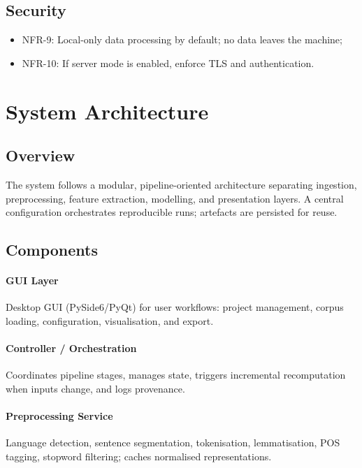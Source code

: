 \subsection{Security}
\begin{itemize}
    \item NFR-9: Local-only data processing by default; no data leaves the machine;
    \item NFR-10: If server mode is enabled, enforce TLS and authentication.
\end{itemize}

\section{System Architecture}
\subsection{Overview}
The system follows a modular, pipeline-oriented architecture separating ingestion, preprocessing, feature extraction, modelling, and presentation layers. A central configuration orchestrates reproducible runs; artefacts are persisted for reuse.

% 
% 
% 

\subsection{Components}
\paragraph{GUI Layer}
Desktop GUI (PySide6/PyQt) for user workflows: project management, corpus loading, configuration, visualisation, and export.

\paragraph{Controller / Orchestration}
Coordinates pipeline stages, manages state, triggers incremental recomputation when inputs change, and logs provenance.

\paragraph{Preprocessing Service}
Language detection, sentence segmentation, tokenisation, lemmatisation, POS tagging, stopword filtering; caches normalised representations.

